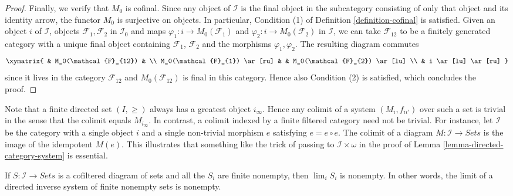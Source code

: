 \begin{proof}
\medskip\noindent
Finally, we verify that $M_0$ is cofinal. Since any
object of $\mathcal{I}$ is the final object in the subcategory
consisting of only that object and its identity arrow, the functor
$M_0$ is surjective on objects. In particular, Condition (1) of
Definition \ref{definition-cofinal} is satisfied. Given
an object $i$ of $\mathcal{I}$, objects $\mathcal{F}_1, \mathcal{F}_2$ in
$\mathcal{I}_0$ and maps $\varphi_1 : i \to M_0(\mathcal{F}_1)$
and $\varphi_2 : i \to M_0(\mathcal{F}_2)$ in
$\mathcal{I}$, we can take $\mathcal{F}_{12}$ to be a finitely
generated category with a unique final object containing
$\mathcal{F}_1$, $\mathcal{F}_2$ and the morphisms $\varphi_1, \varphi_2$.
The resulting diagram commutes
$$
\xymatrix{
& M_0(\mathcal{F}_{12}) & \\
M_0(\mathcal{F}_{1}) \ar[ru] & & M_0(\mathcal{F}_{2}) \ar[lu] \\
& i \ar[lu] \ar[ru]
}
$$
since it lives in the category $\mathcal{F}_{12}$ and
$M_0(\mathcal{F}_{12})$ is final in
this category. Hence also Condition (2) is satisfied, which concludes
the proof.
\end{proof}

\begin{remark}
\label{remark-trick-needed}
Note that a finite directed set $(I, \geq)$ always has a greatest object
$i_\infty$. Hence any colimit of a system $(M_i, f_{ii'})$ over such a set
is trivial in the sense that the colimit equals $M_{i_\infty}$. In contrast,
a colimit indexed by a finite filtered category need not
be trivial. For instance, let $\mathcal{I}$ be the category with a single object
$i$ and a single non-trivial morphism $e$ satisfying $e = e \circ e$. The
colimit of a diagram $M : \mathcal{I} \to Sets$ is the image of the
idempotent $M(e)$. This illustrates that something like the trick of passing
to $\mathcal{I}\times \omega$ in the proof of
Lemma \ref{lemma-directed-category-system} is essential.
\end{remark}

\begin{lemma}
\label{lemma-nonempty-limit}
If $S : \mathcal{I} \to \textit{Sets}$ is a cofiltered diagram of sets
and all the $S_i$ are finite nonempty, then $\lim_i S_i$ is nonempty.
In other words, the limit of a directed inverse system of finite nonempty sets
is nonempty.
\end{lemma}


